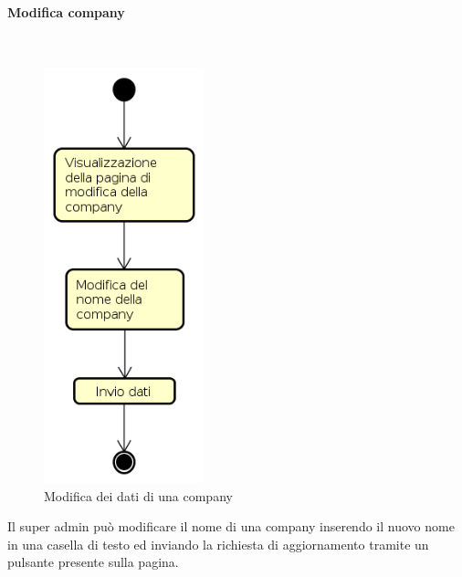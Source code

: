\paragraph{Modifica company} \mbox{} \\
\begin{figure}[H]
\begin{center}
\includegraphics[height=12cm]{res/sections/backend/activities/modificaCompanySA.png}
\caption{Modifica dei dati di una company}
\end{center}
\end{figure}
Il super admin può modificare il nome di una company inserendo il nuovo nome in una casella di testo ed inviando la richiesta di aggiornamento tramite un pulsante presente sulla pagina.
